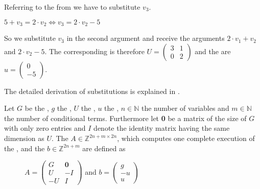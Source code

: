\begin{example}
	\label{ex:updatematrix-and-constants}
	Referring to the \its from  we have to substitute $v_3$.
	\begin{center}
		$5+v_3=2\cdot v_2 \Leftrightarrow v_3=2\cdot v_2-5$
	\end{center}
	So we substitute $v_3$ in the second argument and receive the arguments $2\cdot v_1+v_2$ and $2\cdot v_2-5$.
	The corresponding \updatematrix is therefore $U = \begin{pmatrix} 3 & 1 \\ 0 & 2 \end{pmatrix}$ and the \updateconstants are $u = \begin{pmatrix} 0 \\ -5 \end{pmatrix}$.
	
	The detailed derivation of substitutions is explained in .
\end{example}

\begin{definition}
	\label{def:iteration}
	Let $G$ be the \guardmatrix, $g$ the \guardconstants, $U$ the \updatematrix, $u$ the \updateconstants, $n\in \mathbb{N}$ the number of variables and $m \in \mathbb{N}$ the number of conditional terms. \newline
	Furthermore let \textbf{0} be a matrix of the size of $G$ with only zero entries and $I$ denote the identity matrix having the same dimension as $U$. \newline
	The \iterationmatrix $A \in \mathbb{Z}^{2n+m \times 2n}$, which computes one complete execution of the \loopt, and the \iterationconstants $b\in \mathbb{Z}^{2n+m} $ are defined as
	\begin{figure}[H]
		\centering
		$A = \begin{pmatrix} G & \textbf{0} \\ U & -I \\ -U & I \end{pmatrix}$ and $b = \begin{pmatrix} g \\ -u \\ u \end{pmatrix}$ \cite{leike2014geometric}
	\end{figure}	
\end{definition}

